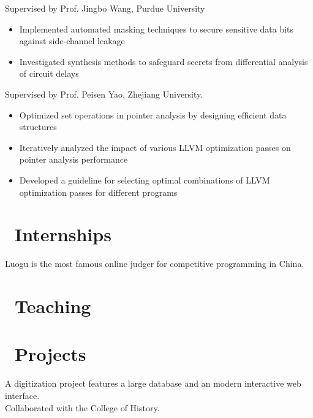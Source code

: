 \documentclass{resume}
\begin{document}
Supervised by Prof. Jingbo Wang, Purdue University  
\begin{itemize}[itemsep=0.5ex]  
  \item Implemented automated masking techniques to secure sensitive data bits against side-channel leakage  
  \item Investigated synthesis methods to safeguard secrets from differential analysis of circuit delays  
\end{itemize}

Supervised by Prof. Peisen Yao, Zhejiang University.  
\begin{itemize}[itemsep=0.5ex]
  \item Optimized set operations in pointer analysis by designing efficient data structures
  \item Iteratively analyzed the impact of various LLVM optimization passes on pointer analysis performance
  \item Developed a guideline for selecting optimal combinations of LLVM optimization passes for different programs
\end{itemize}

\section{\faUsers\ Internships}
Luogu is the most famous online judger for competitive programming in China.

\section{\faBook\ Teaching}

\section{\faCode\ Projects}
A digitization project features a large database and an modern interactive web interface.\\
Collaborated with the College of History.
\end{document}
